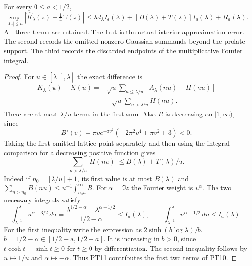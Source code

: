 \begin{swthetatheorem}
For every $0\leq a<1/2$,
\begin{equation}\tag{PT10}
 \sup_{|\Im z|\leq a}
 \left|\widehat K_\lambda(z)-\tfrac14\Xi(z)\right|
 \leq \lambda d_\lambda I_a(\lambda)
       +[B(\lambda)+T(\lambda)]I_a(\lambda)+R_a(\lambda).
\end{equation}
All three terms are retained. The first is the actual interior
approximation error. The second records the omitted nonzero
Gaussian summands beyond the prolate support. The third records
the discarded endpoints of the multiplicative Fourier integral.
\end{swthetatheorem}
\begin{proof}
For $u\in[\lambda^{-1},\lambda]$ the exact difference is
\begin{equation}\tag{PT11}
 \begin{split}
 K_\lambda(u)-K(u)
   ={}&\sqrt u\sum_{n\leq\lambda/u}
                       [A_\lambda(nu)-H(nu)]\\
     &-\sqrt u\sum_{n>\lambda/u}H(nu).
 \end{split}
\end{equation}
There are at most $\lambda/u$ terms in the first sum.
Also $B$ is decreasing on $[1,\infty)$, since
\[
 B'(v)=\pi v e^{-\pi v^2}(-2\pi^2v^4+\pi v^2+3)<0.
\]
Taking the first omitted lattice point separately and then
using the integral comparison for a decreasing positive function gives
\begin{equation}\tag{PT12}
 \sum_{n>\lambda/u}|H(nu)|\leq B(\lambda)+T(\lambda)/u.
\end{equation}
Indeed if $n_0=\lfloor\lambda/u\rfloor+1$, its first value is
at most $B(\lambda)$ and
$\sum_{n>n_0}B(nu)\leq u^{-1}\int_{n_0u}^\infty B$.
For $\alpha=\Im z$ the Fourier weight is $u^\alpha$.
The two necessary integrals satisfy
\[
 \int_{\lambda^{-1}}^\lambda u^{\alpha-3/2}\,du
 =\frac{\lambda^{1/2-\alpha}-\lambda^{\alpha-1/2}}{1/2-\alpha}
 \leq I_a(\lambda),
 \qquad
 \int_{\lambda^{-1}}^\lambda u^{\alpha-1/2}\,du
 \leq I_a(\lambda).
\]
For the first inequality write the expression as
$2\sinh(b\log\lambda)/b$, $b=1/2-\alpha\in[1/2-a,1/2+a]$.
It is increasing in $b>0$, since
$t\cosh t-\sinh t\geq0$ for $t\geq0$ by differentiation.
The second inequality follows by $u\mapsto1/u$ and
$\alpha\mapsto-\alpha$. Thus PT11 contributes the first two
terms of PT10.


\end{proof}

